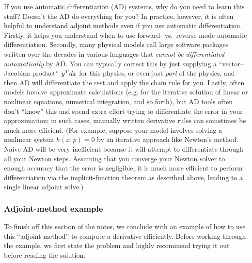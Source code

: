 If you use automatic differentiation (AD) systems, why do you need to learn this stuff?  Doesn't the AD do everything for you?
In practice, however, it is often helpful to understand adjoint methods even if you use automatic differentiation. Firstly, it helps you understand when to use forward- vs.~reverse-mode automatic differentiation. Secondly, many physical models call large software packages written over the decades in various languages that \emph{cannot be differentiated automatically} by AD.  You can typically correct this by just supplying a ``vector--Jacobian product'' $y^T d x$ for this physics, or even just \emph{part} of the physics, and then AD will differentiate the rest and apply the chain rule for you. Lastly, often models involve approximate calculations (e.g. for the iterative solution of linear or nonlinear equations, numerical integration, and so forth), but AD tools often don't ``know'' this and spend extra effort trying to differentiate the error in your approximation; in such cases, manually written derivative rules can sometimes be much more efficient.  (For example, suppose your model involves solving a nonlinear system $h(x,p) = 0$ by an iterative approach like Newton's method.  Naive AD will be very inefficient because it will attempt to differentiate through all your Newton steps.  Assuming that you converge your Newton solver to enough accuracy that the error is negligible, it is much more efficient to perform differentiation via the implicit-function theorem as described above, leading to a single linear adjoint solve.)

\subsubsection{Adjoint-method example}

To finish off this section of the notes, we conclude with an example of how to use this ``adjoint method'' to compute a derivative efficiently. Before working through the example, we first state the problem and highly recommend trying it out before reading the solution.

